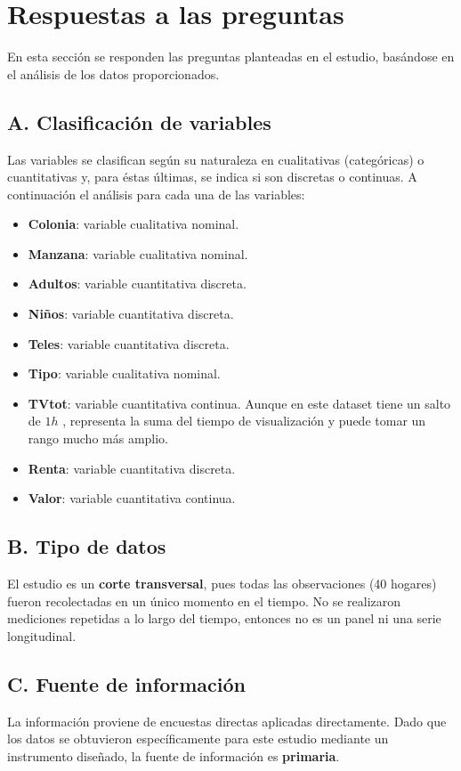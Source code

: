 \documentclass[10pt]{article}
\begin{document}
\section{Respuestas a las preguntas}
En esta sección se responden las preguntas planteadas en el estudio, basándose en el análisis de los datos proporcionados.

\subsection*{A. Clasificación de variables}
Las variables se clasifican según su naturaleza en cualitativas (categóricas) o cuantitativas y, para éstas últimas, se indica si son discretas o continuas. A continuación el análisis para cada una de las variables:

\begin{itemize}
    \item \textbf{Colonia}: variable cualitativa nominal.
    \item \textbf{Manzana}: variable cualitativa nominal.
    \item \textbf{Adultos}: variable cuantitativa discreta.
    \item \textbf{Niños}: variable cuantitativa discreta.
    \item \textbf{Teles}: variable cuantitativa discreta.
    \item \textbf{Tipo}: variable cualitativa nominal.
    \item \textbf{TVtot}: variable cuantitativa continua. Aunque en este dataset tiene un salto de $1 h$ , representa la suma del tiempo de visualización y puede tomar un rango mucho más amplio.
    \item \textbf{Renta}: variable cuantitativa discreta.
    \item \textbf{Valor}: variable cuantitativa continua.
\end{itemize}

\subsection*{B. Tipo de datos}
El estudio es un \textbf{corte transversal}, pues todas las observaciones (40 hogares) fueron recolectadas en un único momento en el tiempo. No se realizaron mediciones repetidas a lo largo del tiempo, entonces no es un panel ni una serie longitudinal.

\subsection*{C. Fuente de información}
La información proviene de encuestas directas aplicadas directamente. Dado que los datos se obtuvieron específicamente para este estudio mediante un instrumento diseñado, la fuente de información es \textbf{primaria}.
\end{document}
